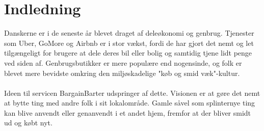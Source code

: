 \chapter{Indledning}
Danskerne er i de seneste år blevet draget af deleøkonomi og genbrug. Tjenester som Uber, GoMore og Airbnb er i stor vækst, fordi de har gjort det nemt og let tilgængeligt for brugere at dele deres bil eller bolig og samtidig tjene lidt penge ved siden af. Genbrugsbutikker er mere populære end nogensinde, og folk er blevet mere bevidste omkring den miljøskadelige "køb og smid væk"-kultur.\cite{Genbrug} \\ \\ \noindent
Ideen til servicen BargainBarter udspringer af dette. Visionen er at gøre det nemt at bytte ting med andre folk i sit lokalområde. Gamle såvel som splinternye ting kan blive anvendt eller genanvendt i et andet hjem, fremfor at der bliver smidt ud og købt nyt. 
\\ \noindent




